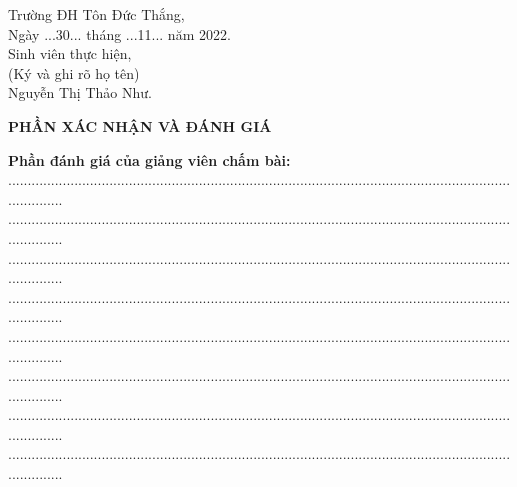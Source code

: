 \documentclass[12pt,a4paper,2sides]{report}
\newcommand{\tacgia}{Nguyễn Thị Thảo Như} %
\newcommand{\nam}{2022}
\begin{document}
\begin{center}
	\hspace*{7cm}Trường ĐH Tôn Đức Thắng,\\
	\hspace*{7cm}Ngày ...30... tháng ...11... năm \nam.\\
	\hspace*{7cm}Sinh viên thực hiện,\\
	\hspace*{7cm}(Ký và ghi rõ họ tên)\\
	\vspace*{0.2cm}
	\vspace*{2cm}
	\hspace*{7cm}\tacgia.
\end{center}		
	\newpage
\begin{center}
	\Large{\textbf{PHẦN XÁC NHẬN VÀ ĐÁNH GIÁ}}
\end{center}
	\textbf{Phần đánh giá của giảng viên chấm bài:}\\
	...............................................................................................................................................\\
	...............................................................................................................................................\\
	...............................................................................................................................................\\
	...............................................................................................................................................\\
	...............................................................................................................................................\\
	...............................................................................................................................................\\
	...............................................................................................................................................\\
	...............................................................................................................................................\\
\end{document}
